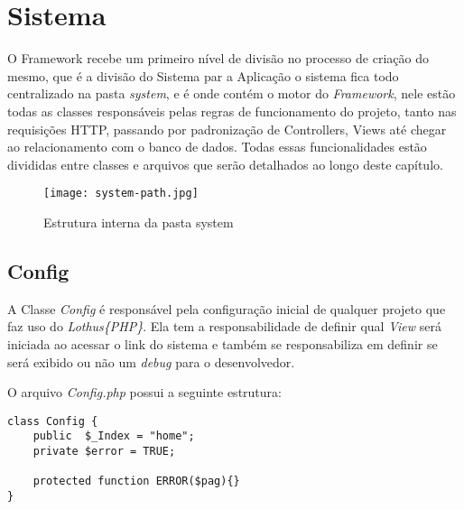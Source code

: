     \section{Sistema\label{sec:system-core}}

        O Framework recebe um primeiro nível de divisão no processo de criação do mesmo, que é a divisão do Sistema par a Aplicação o sistema fica todo centralizado na pasta \emph{system}, e é onde contém o motor do \emph{Framework}, nele estão todas as classes responsáveis pelas regras de funcionamento do projeto, tanto nas requisições HTTP, passando por padronização de Controllers, Views até chegar ao relacionamento com o banco de dados. Todas essas funcionalidades estão divididas entre classes e arquivos que serão detalhados ao longo deste capítulo.

    \begin{figure}[!htb]
        \centering
        \texttt{[image: system-path.jpg]}
        \caption{\small Estrutura interna da pasta system}
        \label{cap:sass}
    \end{figure}



        \subsection{Config\label{sub:system-config}}

            A Classe \emph{Config} é responsável pela configuração inicial de qualquer projeto que faz uso do \emph{Lothus\{PHP\}}. Ela tem a responsabilidade de definir qual \emph{View} será iniciada ao acessar o link do sistema e também se responsabiliza em definir se será exibido ou não um \emph{debug} para o desenvolvedor.

            \emph{}

            O arquivo \emph{Config.php} possui a seguinte estrutura:

            \emph{}

\begin{lstlisting}
class Config {
    public  $_Index = "home";
    private $error = TRUE;

    protected function ERROR($pag){}
}
\end{lstlisting}


